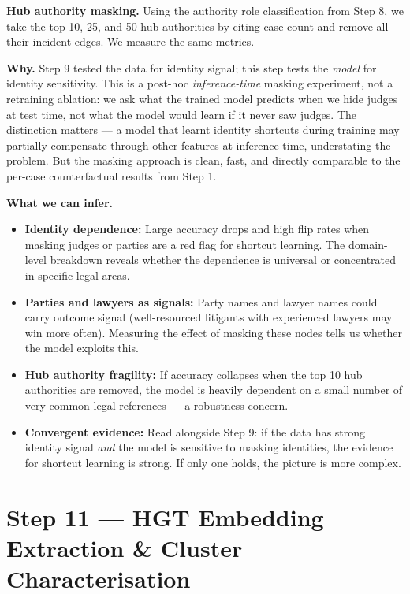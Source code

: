 \documentclass[11pt,a4paper]{article}
\begin{document}
\textbf{Hub authority masking.} Using the authority role classification from Step 8,
we take the top 10, 25, and 50 hub authorities by citing-case count and remove all
their incident edges. We measure the same metrics.

\textbf{Why.}
Step 9 tested the data for identity signal; this step tests the \emph{model} for
identity sensitivity. This is a post-hoc \emph{inference-time} masking experiment,
not a retraining ablation: we ask what the trained model predicts when we hide judges
at test time, not what the model would learn if it never saw judges. The distinction
matters --- a model that learnt identity shortcuts during training may partially
compensate through other features at inference time, understating the problem. But the
masking approach is clean, fast, and directly comparable to the per-case counterfactual
results from Step 1.

\textbf{What we can infer.}
\begin{itemize}
  \item \textbf{Identity dependence:} Large accuracy drops and high flip rates when
    masking judges or parties are a red flag for shortcut learning. The domain-level
    breakdown reveals whether the dependence is universal or concentrated in specific
    legal areas.
  \item \textbf{Parties and lawyers as signals:} Party names and lawyer names could
    carry outcome signal (well-resourced litigants with experienced lawyers may win
    more often). Measuring the effect of masking these nodes tells us whether the model
    exploits this.
  \item \textbf{Hub authority fragility:} If accuracy collapses when the top 10 hub
    authorities are removed, the model is heavily dependent on a small number of very
    common legal references --- a robustness concern.
  \item \textbf{Convergent evidence:} Read alongside Step 9: if the data has strong
    identity signal \emph{and} the model is sensitive to masking identities, the
    evidence for shortcut learning is strong. If only one holds, the picture is more
    complex.
\end{itemize}

\bigskip

\section{Step 11 \texorpdfstring{\textcolor{stepgray}{---}}{---} HGT Embedding Extraction \& Cluster Characterisation}
\end{document}
